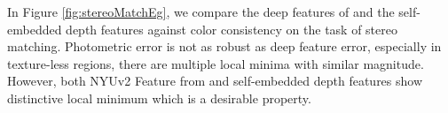 \documentclass[10pt,twocolumn,letterpaper]{article}
\begin{document}








In Figure \ref{fig:stereoMatchEg}, we compare the deep features of \cite{weerasekera2017feature} and the self-embedded depth features against color consistency on the task of stereo matching. Photometric error is not as robust as deep feature error, especially in texture-less regions, there are multiple local minima with similar magnitude. However, both NYUv2 Feature from \cite{weerasekera2017feature} and self-embedded depth features show distinctive local minimum which is a desirable property.
\end{document}
